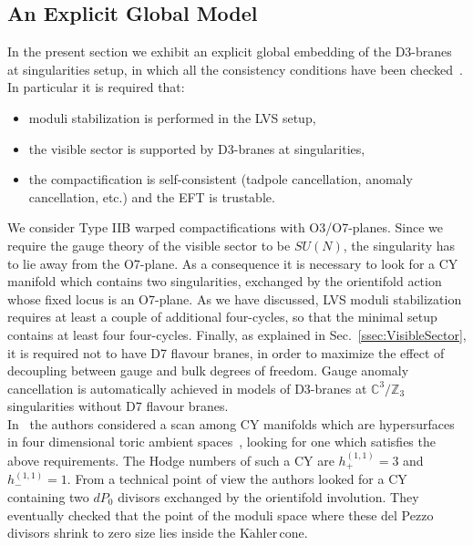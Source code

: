 \documentclass[12pt,a4paper]{book}
\newcommand{\Kahler}{\ensuremath{\text{K}\ddot{\text{a}}\text{hler}\,}}
\begin{document}
\subsection{An Explicit Global Model}
\label{ssec:ExplicitGlobalModel}

In the present section we exhibit an explicit global embedding of the D3-branes at singularities setup, in which all the consistency conditions have been checked~\cite{Cicoli:2012vw}. In particular it is required that:
\begin{itemize}
\item moduli stabilization is performed in the LVS setup,
\item the visible sector is supported by D3-branes at singularities,
\item the compactification is self-consistent (tadpole cancellation, anomaly cancellation, etc.) and the EFT is trustable.
\end{itemize}
We consider Type IIB warped compactifications with O3/O7-planes. Since we require the gauge theory of the visible sector to be $SU(N)$, the singularity has to lie away from the O7-plane. As a consequence it is necessary to look for a CY manifold which contains two singularities, exchanged by the orientifold action whose fixed locus is an O7-plane. As we have discussed, LVS moduli stabilization requires at least a couple of additional four-cycles, so that the minimal setup contains at least four four-cycles. Finally, as explained in Sec.~\ref{ssec:VisibleSector}, it is required not to have D7 flavour branes, in order to maximize the effect of decoupling between gauge and bulk degrees of freedom. Gauge anomaly cancellation is automatically achieved in models of D3-branes at $\mathbb{C}^3/\mathbb{Z}_3$ singularities without D7 flavour branes.\\

In~\cite{Cicoli:2012vw} the authors considered a scan among CY manifolds which are hypersurfaces in four dimensional toric ambient spaces~\cite{Kreuzer:2006ax, Skarke:1998yk, Denef:2008wq, CYData, Kreuzer:2002uu, Braun:2011ik, Braun:2012vh}, looking for one which satisfies the above requirements. The Hodge numbers of such a CY are $h^{(1,1)}_+ = 3$ and $h^{(1,1)}_- = 1$. From a technical point of view the authors looked for a CY containing two $dP_0$ divisors exchanged by the orientifold involution. They eventually checked that the point of the moduli space where these del Pezzo divisors shrink to zero size lies inside the \Kahler cone.\\
\end{document}
